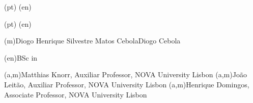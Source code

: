 \ntspecialization(pt){}
\ntspecialization(en){}

\ntsponsors(pt){}
\ntsponsors(en){}

\ntauthorname(m){Diogo Henrique Silvestre Matos Cebola}{Diogo Cebola}

\ntauthordegree(en){BSc in }


(a,m){Matthias Knorr, Auxiliar Professor, NOVA University Lisbon}
(a,m){João Leitão, Auxiliar Professor, NOVA University Lisbon}
(a,m){Henrique Domingos, Associate Professor, NOVA University Lisbon}


